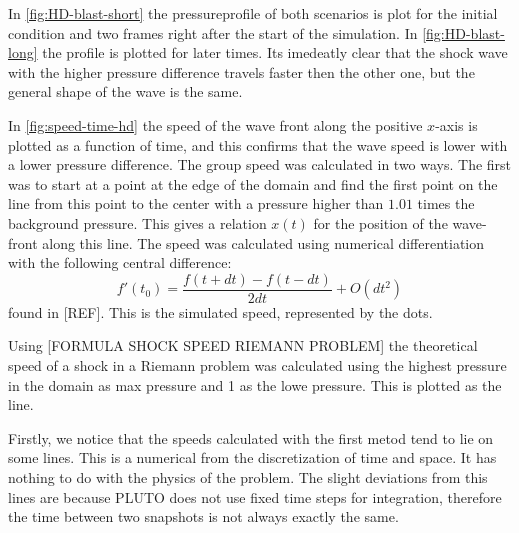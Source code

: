 In \autoref{fig:HD-blast-short} the pressureprofile of both scenarios is plot for the initial condition and two frames right after the start of the simulation.
In \autoref{fig:HD-blast-long} the profile is plotted for later times.
Its imedeatly clear that the shock wave with the higher pressure difference travels faster then the other one, but the general shape of the wave is the same.



In \autoref{fig:speed-time-hd} the speed of the wave front along the positive $x$-axis is plotted as a function of time, and this confirms that the wave speed is lower with a lower pressure difference.
The group speed was calculated in two ways. The first was to start at a point at the edge of the domain and find the first point on the line from this point to the center with a pressure higher than $1.01$ times the background pressure.
This gives a relation $x(t)$ for the position of the wave-front along this line.
The speed was calculated using numerical differentiation with the following central difference:
\begin{equation*}
	f'(t_0) = \frac{f(t+dt)-f(t-dt)}{2dt} + O(dt^2)
\end{equation*}
found in [REF]. This is the simulated speed, represented by the dots. 

Using [FORMULA SHOCK SPEED RIEMANN PROBLEM]
the theoretical speed of a shock in a Riemann problem was calculated using the highest pressure in the domain as max pressure and 1 as the lowe pressure. This is plotted as the line.

Firstly, we notice that the speeds calculated with the first metod tend to lie on some lines. This is a numerical from the discretization of time and space. 
It has nothing to do with the physics of the problem. 
The slight deviations from this lines are because PLUTO does not use fixed time steps for integration, therefore the time between two snapshots is not always exactly the same.

